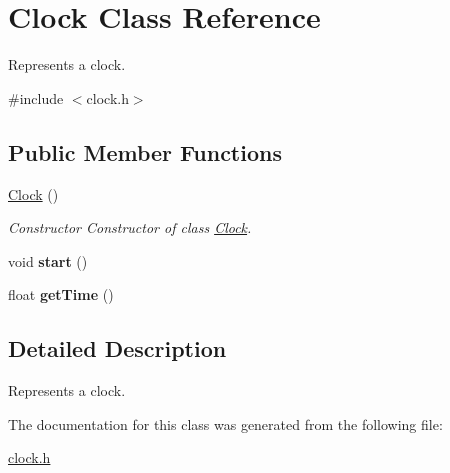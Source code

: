 \hypertarget{class_clock}{
\section{Clock Class Reference}
\label{class_clock}
}


Represents a clock.  




{\ttfamily \#include $<$clock.h$>$}

\subsection*{Public Member Functions}
\begin{DoxyCompactItemize}
\item 
\hypertarget{class_clock_adbc370eb6b5f8d01645cf440188160a8}{
\hyperlink{class_clock_adbc370eb6b5f8d01645cf440188160a8}{Clock} ()}
\label{class_clock_adbc370eb6b5f8d01645cf440188160a8}

\begin{DoxyCompactList}\small\item\em Constructor Constructor of class \hyperlink{class_clock}{Clock}. \item\end{DoxyCompactList}\item 
\hypertarget{class_clock_a8a050959dcff11c85d695989e9099a8c}{
void {\bfseries start} ()}
\label{class_clock_a8a050959dcff11c85d695989e9099a8c}

\item 
\hypertarget{class_clock_a29b05ea2726f6da0f2d03be460851f5f}{
float {\bfseries getTime} ()}
\label{class_clock_a29b05ea2726f6da0f2d03be460851f5f}

\end{DoxyCompactItemize}


\subsection{Detailed Description}
Represents a clock. 

The documentation for this class was generated from the following file:\begin{DoxyCompactItemize}
\item 
\hyperlink{clock_8h}{clock.h}\end{DoxyCompactItemize}
